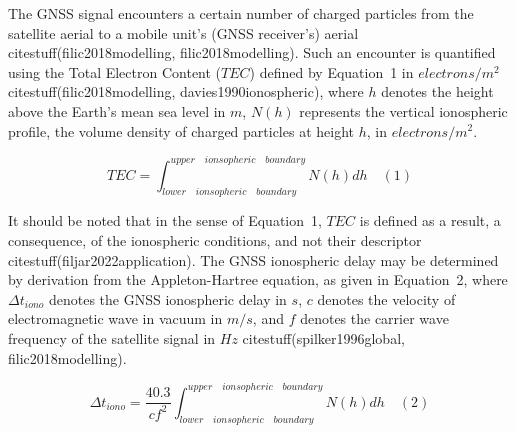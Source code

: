 \documentclass[preprint,12pt]{elsarticle}
\begin{document}
\begin{table}[ht]
    \centering
    \caption{The Space weather – GNSS PNT performance coupling model, after citestuff(filic2018modelling).}
    \label{tab:Space weather – GNSS PNT performance coupling model}
\end{table}

The GNSS signal encounters a certain number of charged particles from the satellite aerial to a mobile unit’s (GNSS receiver’s) aerial citestuff(filic2018modelling, filic2018modelling). Such an encounter is quantified using the Total Electron Content ($TEC$) defined by Equation~1 in $electrons/m^{2}$  citestuff(filic2018modelling, davies1990ionospheric), where $h$ denotes the height above the Earth’s mean sea level in $m$, $N(h)$ represents the vertical ionospheric profile, the volume density of charged particles at height $h$, in $electrons/m^{2}$.

\begin{equation}
	TEC = \int_{lower \quad ionsopheric \quad boundary}^{upper \quad ionsopheric \quad boundary}N(h)dh
	\quad\left(1\right)
\end{equation}

It should be noted that in the sense of Equation~1, $TEC$ is defined as a result, a consequence, of the ionospheric conditions, and not their descriptor citestuff(filjar2022application). The GNSS ionospheric delay may be determined by derivation from the Appleton-Hartree equation, as given in Equation~2, where $\Delta t_{iono}$ denotes the GNSS ionospheric delay in $s$, $c$ denotes the velocity of electromagnetic wave in vacuum in $m/s$, and $f$ denotes the carrier wave frequency of the satellite signal in $Hz$ citestuff(spilker1996global, filic2018modelling).

\begin{equation}
	\Delta t_{iono} = \frac{40.3}{c f^{2}} \int_{lower \quad ionsopheric \quad boundary}^{upper \quad ionsopheric \quad boundary}N(h)dh
	\quad\left(2\right)
\end{equation}
\end{document}
